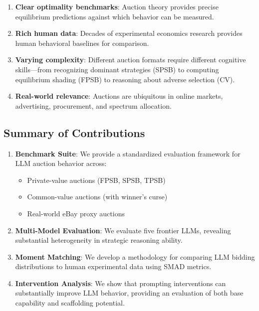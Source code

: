 \documentclass[12pt]{article}
\begin{document}
\begin{enumerate}
    \item \textbf{Clear optimality benchmarks}: Auction theory provides precise equilibrium predictions against which behavior can be measured.

    \item \textbf{Rich human data}: Decades of experimental economics research provides human behavioral baselines for comparison.

    \item \textbf{Varying complexity}: Different auction formats require different cognitive skills---from recognizing dominant strategies (SPSB) to computing equilibrium shading (FPSB) to reasoning about adverse selection (CV).

    \item \textbf{Real-world relevance}: Auctions are ubiquitous in online markets, advertising, procurement, and spectrum allocation.
\end{enumerate}

\subsection{Summary of Contributions}

\begin{enumerate}
    \item \textbf{Benchmark Suite}: We provide a standardized evaluation framework for LLM auction behavior across:
    \begin{itemize}
        \item Private-value auctions (FPSB, SPSB, TPSB)
        \item Common-value auctions (with winner's curse)
        \item Real-world eBay proxy auctions
    \end{itemize}

    \item \textbf{Multi-Model Evaluation}: We evaluate five frontier LLMs, revealing substantial heterogeneity in strategic reasoning ability.

    \item \textbf{Moment Matching}: We develop a methodology for comparing LLM bidding distributions to human experimental data using SMAD metrics.

    \item \textbf{Intervention Analysis}: We show that prompting interventions can substantially improve LLM behavior, providing an evaluation of both base capability and scaffolding potential.
\end{enumerate}
\end{document}

